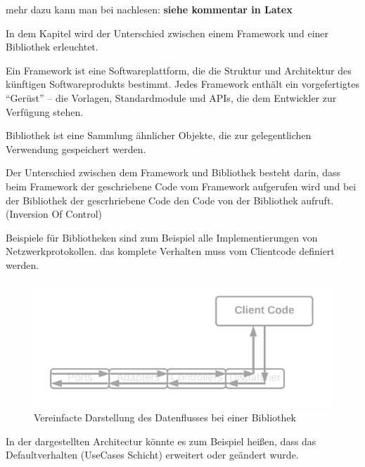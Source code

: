 mehr dazu kann man bei nachlesen: \textbf{siehe kommentar in Latex}%

In dem Kapitel wird der Unterschied zwischen einem Framework und einer Bibliothek erleuchtet.

Ein Framework ist eine Softwareplattform, die die Struktur und Architektur des künftigen Softwareprodukts bestimmt.
Jedes Framework enthält ein vorgefertigtes “Gerüst” – die Vorlagen, Standardmodule und APIs, 
die dem Entwickler zur Verfügung stehen.

Bibliothek ist eine Sammlung ähnlicher Objekte, die zur gelegentlichen Verwendung gespeichert werden.

Der Unterschied zwischen dem Framework und Bibliothek besteht darin, 
dass beim Framework der geschriebene Code vom Framework aufgerufen wird 
und bei der Bibliothek der gescrhriebene Code den Code von der Bibliothek aufruft.
(Inversion Of Control)


Beispiele für Bibliotheken sind zum Beispiel alle Implementierungen von Netzwerkprotokollen.
das komplete Verhalten muss vom Clientcode definiert werden.

\begin{figure}[H]
    \centering
    \includegraphics[width=1\textwidth]{./images/Dataflow Library.png}
    \caption{Vereinfacte Darstellung des Datenflusses bei einer Bibliothek}
    \label{fig:SimpliedDataflowLibrary}
\end{figure}

In der dargestellten Architectur könnte es zum Beispiel heißen, 
dass das Defaultverhalten (UseCases Schicht) erweitert oder geändert wurde.

